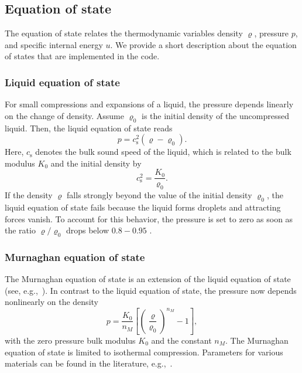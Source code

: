 \documentclass[10pt,fleqn,twoside]{article}
\begin{document}
\subsection{Equation of state}
\label{section:eos}
The equation of state relates the thermodynamic variables density $\varrho$, pressure $p$, and specific internal energy
$u$. We provide a short description about the equation of states that are implemented in the code.
%
\subsubsection{Liquid equation of state}
For small compressions and expansions of a liquid, the pressure depends linearly on the change of density.
Assume $\varrho_0$ is the initial density of the uncompressed liquid. Then, the liquid equation of state reads
%
\begin{equation}
 p = c_\mathrm{s}^2 ( \varrho - \varrho_0 ).
\end{equation}
%
Here, $c_\mathrm{s}$ denotes the bulk sound speed of the liquid, which is related to the bulk modulus $K_0$ and the initial
density by
%
\begin{equation}
 c_\mathrm{s}^2 = \frac{K_0}{\varrho_0}.
\end{equation}
%
If the density $\varrho$ falls strongly beyond the value of the initial density $\varrho_0$, the liquid equation of
state fails because the liquid forms droplets and attracting forces vanish. To account for this
behavior, the pressure is set to zero as
soon as the ratio $\varrho/ \varrho_0$ drops below $0.8-0.95$ \citep{melosh1996impact}.
%
\subsubsection{Murnaghan equation of state}
The Murnaghan equation of state is an extension of the liquid equation of state (see, e.g.,\ \citealt{melosh1996impact}). In contrast to the liquid equation of
state, the pressure now depends nonlinearly on the density
%
\begin{equation}
 p = \frac{K_0}{n_M} \left[ \left( \frac{\varrho}{\varrho_0}\right)^{n_M} -1  \right],
\end{equation}
%
with the zero pressure bulk modulus $K_0$ and the constant $n_M$. The Murnaghan equation of state is limited to
isothermal compression. Parameters for various materials can be found in the literature, e.g.,\ \cite{melosh1996impact}.
%
%
\end{document}
